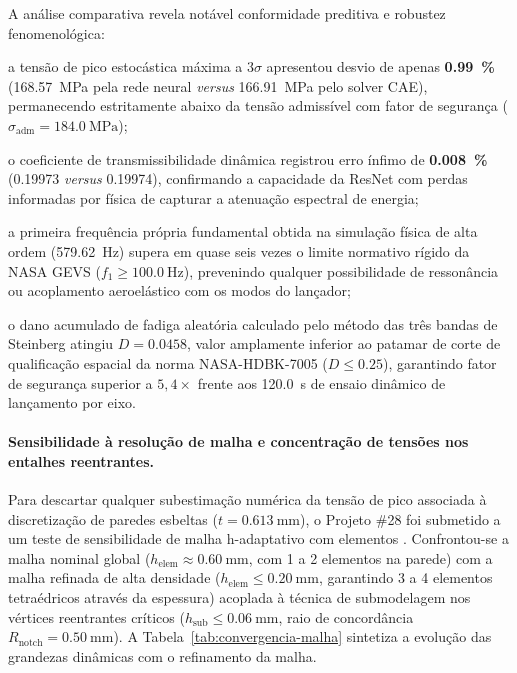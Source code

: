 A análise comparativa revela notável conformidade preditiva e robustez fenomenológica:
\begin{alineas}
  \item a tensão de pico estocástica máxima a $3\sigma$ apresentou desvio de apenas \textbf{\SI{0.99}{\percent}} (\SI{168.57}{\mega\pascal} pela rede neural \textit{versus} \SI{166.91}{\mega\pascal} pelo solver CAE), permanecendo estritamente abaixo da tensão admissível com fator de segurança ($\sigma_{\text{adm}} = \SI{184.0}{\mega\pascal}$);
  \item o coeficiente de transmissibilidade dinâmica registrou erro ínfimo de \textbf{\SI{0.008}{\percent}} (\num{0.19973} \textit{versus} \num{0.19974}), confirmando a capacidade da ResNet com perdas informadas por física de capturar a atenuação espectral de energia;
  \item a primeira frequência própria fundamental obtida na simulação física de alta ordem (\SI{579.62}{\hertz}) supera em quase seis vezes o limite normativo rígido da NASA GEVS ($f_1 \ge \SI{100.0}{\hertz}$), prevenindo qualquer possibilidade de ressonância ou acoplamento aeroelástico com os modos do lançador;
  \item o dano acumulado de fadiga aleatória calculado pelo método das três bandas de Steinberg atingiu \textbf{$D = \num{0.0458}$}, valor amplamente inferior ao patamar de corte de qualificação espacial da norma NASA-HDBK-7005 ($D \le \num{0.25}$), garantindo fator de segurança superior a $5{,}4\times$ frente aos \SI{120.0}{\second} de ensaio dinâmico de lançamento por eixo.
\end{alineas}

\paragraph{Sensibilidade à resolução de malha e concentração de tensões nos entalhes reentrantes.}
Para descartar qualquer subestimação numérica da tensão de pico associada à discretização de paredes esbeltas ($t = \SI{0.613}{\milli\metre}$), o Projeto \#28 foi submetido a um teste de sensibilidade de malha h-adaptativo com elementos . Confrontou-se a malha nominal global ($h_{\text{elem}} \approx \SI{0.60}{\milli\metre}$, com 1 a 2 elementos na parede) com a malha refinada de alta densidade ($h_{\text{elem}} \le \SI{0.20}{\milli\metre}$, garantindo 3 a 4 elementos tetraédricos através da espessura) acoplada à técnica de submodelagem nos vértices reentrantes críticos ($h_{\text{sub}} \le \SI{0.06}{\milli\metre}$, raio de concordância $R_{\text{notch}} = \SI{0.50}{\milli\metre}$). A Tabela~\ref{tab:convergencia-malha} sintetiza a evolução das grandezas dinâmicas com o refinamento da malha.

